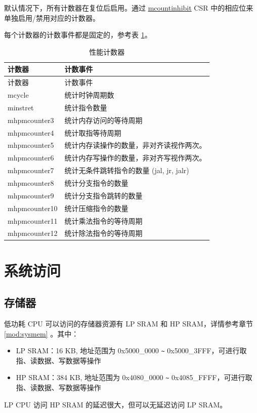\documentclass[main\_\_CN.tex]{subfiles}
\begin{document}
默认情况下，所有计数器在复位后启用。通过 \hyperref[regdesc:LPMCOUNTINHIBIT]{mcountinhibit} CSR 中的相应位来单独启用/禁用对应的计数器。

每个计数器的计数事件都是固定的，参考表 \ref{tab:ulp-pccr}。

\begin{longtable}[c]{|l|l|}
    \caption{性能计数器}\label{tab:ulp-pccr}\\\hline
    \rowcolor{lightgray}
    计数器 & 计数事件 \\\hline
    \endfirsthead
    \hline
    \rowcolor{lightgray}
    计数器 & 计数事件 \\\hline
    \endhead
    \endfoot

    mcycle      & 统计时钟周期数  \\\hline
    minstret    & 统计指令数量 \\\hline
    mhpmcounter3 & 统计内存访问的等待周期  \\\hline
    mhpmcounter4 & 统计取指等待周期 \\\hline
    mhpmcounter5 &  统计内存读操作的数量，非对齐读视作两次。  \\\hline

    mhpmcounter6 & 统计内存写操作的数量，非对齐写视作两次。 \\\hline
    mhpmcounter7 & 统计无条件跳转指令的数量 (jal, jr, jalr)\\\hline
    mhpmcounter8 & 统计分支指令的数量 \\\hline
    mhpmcounter9 & 统计分支指令跳转的数量  \\\hline
    mhpmcounter10 & 统计压缩指令的数量  \\\hline
    mhpmcounter11 & 统计乘法指令的等待周期  \\\hline
    mhpmcounter12 & 统计除法指令的等待周期  \\\hline

\end{longtable}

\section{系统访问}


\subsection{存储器}

\chipname{} 低功耗 CPU 可以访问的存储器资源有 LP SRAM 和 HP SRAM，详情参考章节 \ref{mod:sysmem} \textit{}。其中：
\begin{itemize}
    \item LP SRAM：16 KB, 地址范围为 0x5000\_0000 \verb+~+ 0x5000\_3FFF，可进行取指、读数据、写数据等操作
    \item HP SRAM：384 KB, 地址范围为 0x4080\_0000 \verb+~+ 0x4085\_FFFF，可进行取指、读数据、写数据等操作
\end{itemize}
\begin{tiplisting}
LP CPU 访问 HP SRAM 的延迟很大，但可以无延迟访问 LP SRAM。
\end{tiplisting}
\end{document}
